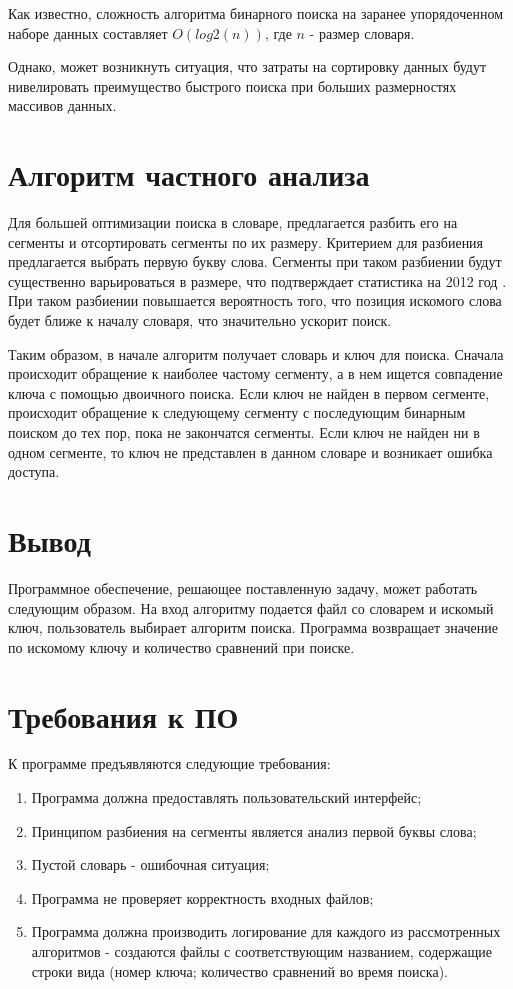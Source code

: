 Как известно, сложность алгоритма бинарного поиска на заранее упорядоченном наборе данных составляет $O(log2(n))$, где $n$ - размер словаря.

Однако, может возникнуть ситуация, что затраты на сортировку данных будут нивелировать преимущество быстрого поиска при больших размерностях массивов данных.

\section{Алгоритм частного анализа}

Для большей оптимизации поиска в словаре, предлагается разбить его на сегменты и отсортировать сегменты по их размеру. Критерием для разбиения предлагается выбрать первую букву слова. Сегменты при таком разбиении будут существенно варьироваться в размере, что подтверждает статистика на 2012 год \cite{wordstat}. При таком разбиении повышается вероятность того, что позиция искомого слова будет ближе к началу словаря, что значительно ускорит поиск.

Таким образом, в начале алгоритм получает словарь и ключ для поиска. Сначала происходит обращение к наиболее частому сегменту, а в нем ищется совпадение ключа с помощью двоичного поиска. Если ключ не найден в первом сегменте, происходит обращение к следующему сег­менту с последующим бинарным поиском до тех пор, пока не закончатся сегменты. Если ключ не найден ни в одном сегменте, то ключ не представлен в данном словаре и возникает ошибка доступа.

\section{Вывод}

Программное обеспечение, решающее поставленную задачу, может работать следующим образом. На вход алгоритму подается файл со словарем и искомый ключ, пользователь выбирает алгоритм поиска. Программа возвращает значение по искомому ключу и количество сравнений при поиске.

\section{Требования к ПО}

К программе предъявляются следующие требования:

\begin{enumerate}
	\item Программа должна предоставлять пользовательский интерфейс;
	\item Принципом разбиения на сегменты является анализ первой буквы слова;
	\item Пустой словарь - ошибочная ситуация;
	\item Программа не проверяет корректность входных файлов;
	\item Программа должна производить логирование для каждого из рас­смотренных алгоритмов - создаются файлы с соответствующим назва­нием, содержащие строки вида (номер ключа; количество сравнений во время поиска).
\end{enumerate}